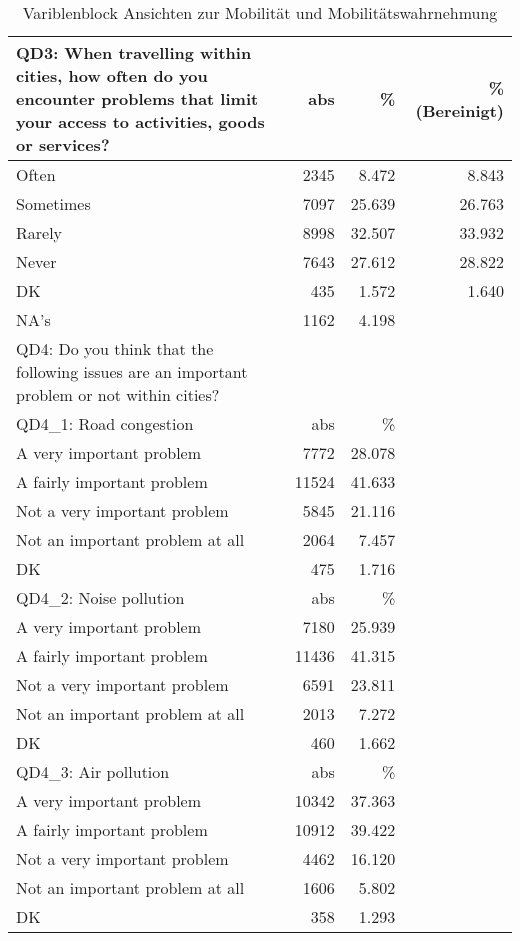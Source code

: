 \begin{table}[h]
	\begin{tabularx}{\textwidth} { b{8cm} | r | r | r}
		QD3: When travelling within cities, how often do you encounter problems that limit your access to
activities, goods or services? & abs & \% & \% (Bereinigt) \\ \hline
		Often      &    2345 &  8.472  &       8.843  \\
		Sometimes  &    7097 & 25.639  &      26.763  \\
		Rarely     &    8998 & 32.507  &      33.932  \\
		Never      &    7643 & 27.612  &      28.822  \\
		DK         &     435 &  1.572  &       1.640  \\
		NA's       &    1162 &  4.198  \\ \hline
		QD4: Do you think that the following issues are an important problem or not within cities? \\ \hline
		QD4\_1: Road congestion & abs & \% \\ \hline 
		A very important problem        &     7772 & 28.078 \\
A fairly important problem          &    11524 & 41.633 \\
Not a very important problem        &     5845 & 21.116 \\
Not an important problem at all     &     2064 &  7.457 \\
DK                                  &      475 &  1.716 \\ \hline
		QD4\_2: Noise pollution & abs & \% \\ \hline 
		A very important problem        &     7180 & 25.939 \\
A fairly important problem          &    11436 & 41.315 \\
Not a very important problem        &     6591 & 23.811 \\
Not an important problem at all     &     2013 &  7.272 \\
DK                                  &      460 &  1.662 \\ \hline
		QD4\_3: Air pollution & abs & \% \\ \hline 

A very important problem            &    10342 & 37.363 \\
A fairly important problem          &    10912 & 39.422 \\
Not a very important problem        &     4462 & 16.120 \\
Not an important problem at all     &     1606 &  5.802 \\
DK                                  &      358 &  1.293 \\

	\end{tabularx}
	\caption{Variblenblock Ansichten zur Mobilität und Mobilitätswahrnehmung}
\end{table}
